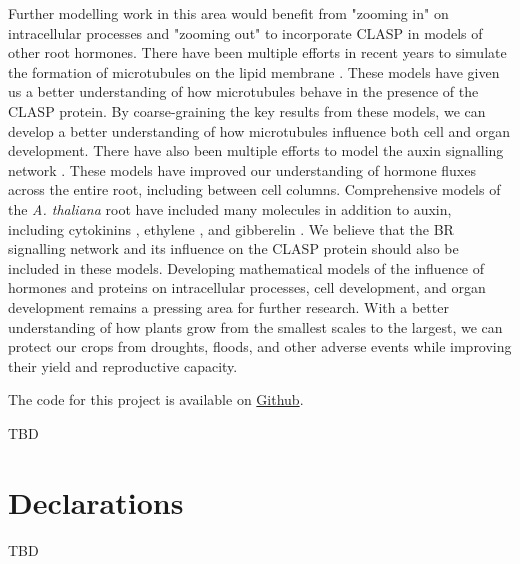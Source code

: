 \documentclass[referee,pdflatex,sn-mathphys-num]{sn-jnl}
\begin{document}
Further modelling work in this area would benefit from "zooming in" on intracellular processes and "zooming out" to incorporate CLASP in models of other root hormones.
There have been multiple efforts in recent years to simulate the formation of microtubules on the lipid membrane \cite{tian2023, tindemans2014, allard2010a}.
These models have given us a better understanding of how microtubules behave in the presence of the CLASP protein.
By coarse-graining the key results from these models, we can develop a better understanding of how microtubules influence both cell and organ development.
There have also been multiple efforts to model the auxin signalling network \cite{grieneisen2007, dimambro2017}.
These models have improved our understanding of hormone fluxes across the entire root, including between cell columns.
Comprehensive models of the \emph{A. thaliana} root have included many molecules in addition to auxin, including cytokinins \cite{salvi2020}, ethylene \cite{moore2024}, and gibberelin \cite{muraro2016}.
We believe that the BR signalling network and its influence on the CLASP protein should also be included in these models.
Developing mathematical models of the influence of hormones and proteins on intracellular processes, cell development, and organ development remains a pressing area for further research.
With a better understanding of how plants grow from the smallest scales to the largest, we can protect our crops from droughts, floods, and other adverse events while improving their yield and reproductive capacity.

\backmatter


The code for this project is available on \href{https://github.com/rileywheadon/clasp-model}{Github}.


TBD

\section*{Declarations}

TBD


\end{document}
